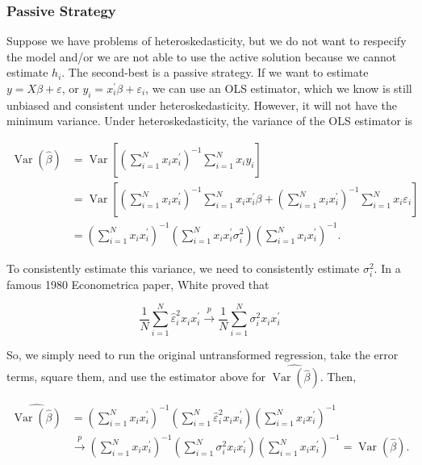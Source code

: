 \subsubsection{Passive Strategy}
Suppose we have problems of heteroskedasticity, but we do not want to respecify the model and/or we are not able to use the active solution because we cannot estimate $h_{i}$. The second-best is a passive strategy. If we want to estimate $y=X \beta+\varepsilon$, or $y_{i}=x_{i}^{\prime} \beta+\varepsilon_{i}$, we can use an OLS estimator, which we know is still unbiased and consistent under heteroskedasticity. However, it will not have the minimum variance. Under heteroskedasticity, the variance of the OLS estimator is

$$
\begin{aligned}
\operatorname{Var}(\widehat{\beta}) & =\operatorname{Var}\left[\left(\sum_{i=1}^{N} x_{i} x_{i}^{\prime}\right)^{-1} \sum_{i=1}^{N} x_{i} y_{i}\right] \\
& =\operatorname{Var}\left[\left(\sum_{i=1}^{N} x_{i} x_{i}^{\prime}\right)^{-1} \sum_{i=1}^{N} x_{i} x_{i}^{\prime} \beta+\left(\sum_{i=1}^{N} x_{i} x_{i}^{\prime}\right)^{-1} \sum_{i=1}^{N} x_{i} \varepsilon_{i}\right] \\
& =\left(\sum_{i=1}^{N} x_{i} x_{i}^{\prime}\right)^{-1}\left(\sum_{i=1}^{N} x_{i} x_{i}^{\prime} \sigma_{i}^{2}\right)\left(\sum_{i=1}^{N} x_{i} x_{i}^{\prime}\right)^{-1} .
\end{aligned}
$$

To consistently estimate this variance, we need to consistently estimate $\sigma_{i}^{2}$. In a famous 1980 Econometrica paper, White proved that

$$
\frac{1}{N} \sum_{i=1}^{N} \widehat{\varepsilon}_{i}^{2} x_{i} x_{i}^{\prime} \xrightarrow{p} \frac{1}{N} \sum_{i=1}^{N} \sigma_{i}^{2} x_{i} x_{i}^{\prime}
$$

So, we simply need to run the original untransformed regression, take the error terms, square them, and use the estimator above for $\widehat{\operatorname{Var}(\widehat{\beta})}$. Then,

$$
\begin{aligned}
\widehat{\operatorname{Var}(\widehat{\beta})} & =\left(\sum_{i=1}^{N} x_{i} x_{i}^{\prime}\right)^{-1}\left(\sum_{i=1}^{N} \widehat{\varepsilon}_{i}^{2} x_{i} x_{i}^{\prime}\right)\left(\sum_{i=1}^{N} x_{i} x_{i}^{\prime}\right)^{-1} \\
& \xrightarrow{p}\left(\sum_{i=1}^{N} x_{i} x_{i}^{\prime}\right)^{-1}\left(\sum_{i=1}^{N} \sigma_{i}^{2} x_{i} x_{i}^{\prime}\right)\left(\sum_{i=1}^{N} x_{i} x_{i}^{\prime}\right)^{-1}=\operatorname{Var}(\widehat{\beta}) .
\end{aligned}
$$

